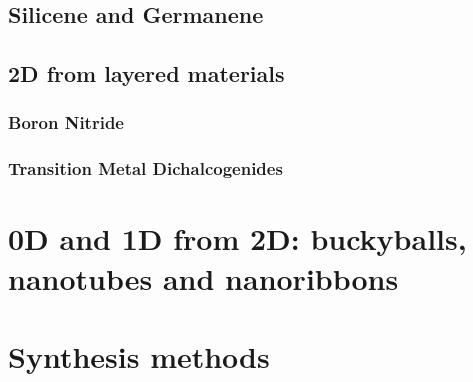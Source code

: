 \subsection{Silicene and Germanene}

\subsection{2D from layered materials}
\subsubsection{Boron Nitride}
\subsubsection{Transition Metal Dichalcogenides}

\section{0D and 1D from 2D: buckyballs, nanotubes and nanoribbons}
\section{Synthesis methods}
